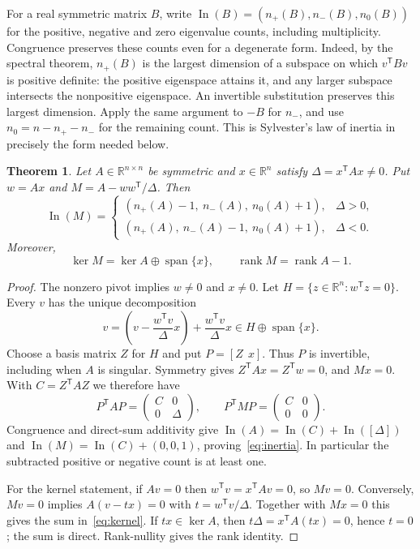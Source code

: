 \documentclass[11pt]{article}
\newtheorem{theorem}{Theorem}
\newcommand{\R}{\mathbb R}
\newcommand{\In}{\operatorname{In}}
\newcommand{\Span}{\operatorname{span}}
\newcommand{\rank}{\operatorname{rank}}
\begin{document}
For a real symmetric matrix $B$, write
$\In(B)=(n_+(B),n_-(B),n_0(B))$ for the positive, negative and zero
eigenvalue counts, including multiplicity.
Congruence preserves these counts even for a degenerate form.
Indeed, by the spectral theorem, $n_+(B)$ is the largest dimension of a
subspace on which $v^{\mathsf T}Bv$ is positive definite: the positive
eigenspace attains it, and any larger subspace intersects the nonpositive
eigenspace. An invertible substitution preserves this largest dimension.
Apply the same argument to $-B$ for $n_-$, and use
$n_0=n-n_+-n_-$ for the remaining count. This is Sylvester's law of inertia
in precisely the form needed below.

\begin{theorem}\label{thm:matrix}
Let $A\in\R^{n\times n}$ be symmetric and $x\in\R^n$ satisfy
$\Delta=x^{\mathsf T}Ax\ne0$. Put $w=Ax$ and
$M=A-ww^{\mathsf T}/\Delta$. Then
\begin{equation}\label{eq:inertia}
\In(M)=
\begin{cases}
(n_+(A)-1,\ n_-(A),\ n_0(A)+1),&\Delta>0,\\
(n_+(A),\ n_-(A)-1,\ n_0(A)+1),&\Delta<0.
\end{cases}
\end{equation}
Moreover,
\begin{equation}\label{eq:kernel}
\ker M=\ker A\oplus\Span\{x\},\qquad \rank M=\rank A-1.
\end{equation}
\end{theorem}
\begin{proof}
The nonzero pivot implies $w\ne0$ and $x\ne0$. Let
$H=\{z\in\R^n:w^{\mathsf T}z=0\}$. Every $v$ has the unique decomposition
\[
v=\left(v-\frac{w^{\mathsf T}v}{\Delta}x\right)
  +\frac{w^{\mathsf T}v}{\Delta}x\in H\oplus\Span\{x\}.
\]
Choose a basis matrix $Z$ for $H$ and put $P=[Z\ \ x]$.
Thus $P$ is invertible, including when $A$ is singular.
Symmetry gives $Z^{\mathsf T}Ax=Z^{\mathsf T}w=0$, and $Mx=0$.
With $C=Z^{\mathsf T}AZ$ we therefore have
\begin{equation}\label{eq:blocks}
P^{\mathsf T}AP=\begin{pmatrix}C&0\\0&\Delta\end{pmatrix},
\qquad
P^{\mathsf T}MP=\begin{pmatrix}C&0\\0&0\end{pmatrix}.
\end{equation}
Congruence and direct-sum additivity give
$\In(A)=\In(C)+\In([\Delta])$ and
$\In(M)=\In(C)+(0,0,1)$, proving~\eqref{eq:inertia}.
In particular the subtracted positive or negative count is at least one.

For the kernel statement, if $Av=0$ then
$w^{\mathsf T}v=x^{\mathsf T}Av=0$, so $Mv=0$.
Conversely, $Mv=0$ implies
$A(v-tx)=0$ with $t=w^{\mathsf T}v/\Delta$.
Together with $Mx=0$ this gives the sum in~\eqref{eq:kernel}.
If $tx\in\ker A$, then $t\Delta=x^{\mathsf T}A(tx)=0$, hence $t=0$;
the sum is direct. Rank-nullity gives the rank identity.
\end{proof}
\end{document}
